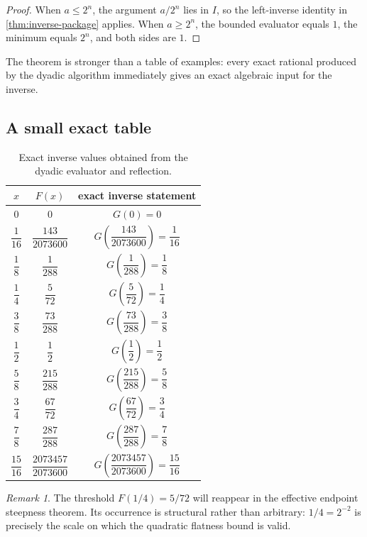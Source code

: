 \documentclass[11pt,oneside]{article}
\theoremstyle{definition}
\theoremstyle{remark}
\newtheorem{remark}[theorem]{Remark}
\newcommand{\InvF}{G}
\begin{document}
\begin{proof}
When $a\leq2^n$, the argument $a/2^n$ lies in $I$, so the left-inverse
identity in \cref{thm:inverse-package} applies.  When $a\geq2^n$, the
bounded evaluator equals $1$, the minimum equals $2^n$, and both sides are
$1$.
\end{proof}

The theorem is stronger than a table of examples: every exact rational
produced by the dyadic algorithm immediately gives an exact algebraic
input for the inverse.

\subsection{A small exact table}

\begin{table}[ht]
\centering
\small
\begin{tabular}{@{}ccc@{}}
\toprule
$x$ & $F(x)$ & exact inverse statement\\
\midrule
$0$ & $0$ & $\InvF(0)=0$\\
$\dfrac1{16}$ & $\dfrac{143}{2073600}$
  & $\InvF\!\left(\dfrac{143}{2073600}\right)=\dfrac1{16}$\\[0.55em]
$\dfrac18$ & $\dfrac1{288}$
  & $\InvF\!\left(\dfrac1{288}\right)=\dfrac18$\\[0.55em]
$\dfrac14$ & $\dfrac5{72}$
  & $\InvF\!\left(\dfrac5{72}\right)=\dfrac14$\\[0.55em]
$\dfrac38$ & $\dfrac{73}{288}$
  & $\InvF\!\left(\dfrac{73}{288}\right)=\dfrac38$\\[0.55em]
$\dfrac12$ & $\dfrac12$
  & $\InvF\!\left(\dfrac12\right)=\dfrac12$\\[0.55em]
$\dfrac58$ & $\dfrac{215}{288}$
  & $\InvF\!\left(\dfrac{215}{288}\right)=\dfrac58$\\[0.55em]
$\dfrac34$ & $\dfrac{67}{72}$
  & $\InvF\!\left(\dfrac{67}{72}\right)=\dfrac34$\\[0.55em]
$\dfrac78$ & $\dfrac{287}{288}$
  & $\InvF\!\left(\dfrac{287}{288}\right)=\dfrac78$\\[0.55em]
$\dfrac{15}{16}$ & $\dfrac{2073457}{2073600}$
  & $\InvF\!\left(\dfrac{2073457}{2073600}\right)=\dfrac{15}{16}$\\
\bottomrule
\end{tabular}
\caption{Exact inverse values obtained from the dyadic evaluator and
reflection.}
\label{tab:inverse-dyadic}
\end{table}

\begin{remark}
The threshold $F(1/4)=5/72$ will reappear in the effective endpoint
steepness theorem.  Its occurrence is structural rather than arbitrary:
$1/4=2^{-2}$ is precisely the scale on which the quadratic flatness bound
is valid.
\end{remark}
\end{document}
